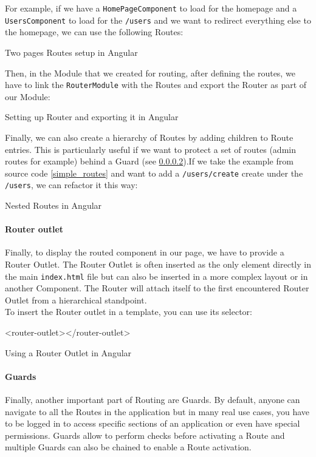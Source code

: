 \documentclass[twoside, openright,11pt,a4paper]{book}
\newenvironment{code}{\captionsetup{type=listing}}{}
\begin{document}
For example, if we have a \verb+HomePageComponent+ to load for the homepage and a \verb+UsersComponent+ to load for the \verb+/users+ and we want to redirect everything else to the homepage, we can use the following Routes:
\begin{code}
	\caption{Two pages Routes setup in Angular}
	\label{simple_routes}
\end{code}

Then, in the Module that we created for routing, after defining the routes, we have to link the \verb+RouterModule+ with the Routes and export the Router as part of our Module:
\begin{code}
	\caption{Setting up Router and exporting it in Angular}
\end{code}

Finally, we can also create a hierarchy of Routes by adding children to Route entries. This is particularly useful if we want to protect a set of routes (admin routes for example) behind a Guard (see \ref{guards}).If we take the example from source code \ref{simple_routes} and want to add a \verb+/users/create+ create under the \verb+/users+, we can refactor it this way:
\begin{code}
	\caption{Nested Routes in Angular}
	\label{nested_routes}
\end{code}

\paragraph{Router outlet}
Finally, to display the routed component in our page, we have to provide a Router Outlet. The Router Outlet is often inserted as the only element directly in the main \verb+index.html+ file but can also be inserted in a more complex layout or in another Component. The Router will attach itself to the first encountered Router Outlet from a hierarchical standpoint.\\

To insert the Router outlet in a template, you can use its selector:
\begin{code}
\begin{inlinehtml}
<router-outlet></router-outlet>
\end{inlinehtml}
	\caption{Using a Router Outlet in Angular}
\end{code}
\paragraph{Guards}
\label{guards}
Finally, another important part of Routing are Guards. By default, anyone can navigate to all the Routes in the application but in many real use cases, you have to be logged in to access specific sections of an application or even have special permissions. Guards allow to perform checks before activating a Route and multiple Guards can also be chained to enable a Route activation. \\
\end{document}
